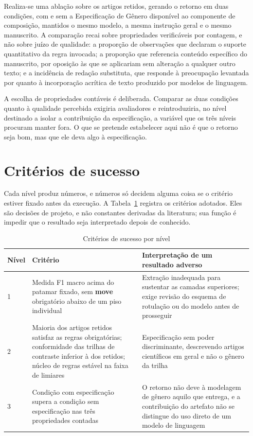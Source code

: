 Realiza-se uma ablação sobre os artigos retidos, gerando o retorno em duas condições, com e sem a Especificação de Gênero disponível ao componente de composição, mantidos o mesmo modelo, a mesma instrução geral e o mesmo manuscrito. A comparação recai sobre propriedades verificáveis por contagem, e não sobre juízo de qualidade: a proporção de observações que declaram o suporte quantitativo da regra invocada; a proporção que referencia conteúdo específico do manuscrito, por oposição às que se aplicariam sem alteração a qualquer outro texto; e a incidência de redação substituta, que responde à preocupação levantada por  quanto à incorporação acrítica de texto produzido por modelos de linguagem.

A escolha de propriedades contáveis é deliberada. Comparar as duas condições quanto à qualidade percebida exigiria avaliadores e reintroduziria, no nível destinado a isolar a contribuição da especificação, a variável que os três níveis procuram manter fora. O que se pretende estabelecer aqui não é que o retorno seja bom, mas que ele deva algo à especificação.


\section{Critérios de sucesso}
\label{sec:criterios}

Cada nível produz números, e números só decidem alguma coisa se o critério estiver fixado antes da execução. A Tabela~\ref{tab:criterios} registra os critérios adotados. Eles são decisões de projeto, e não constantes derivadas da literatura; sua função é impedir que o resultado seja interpretado depois de conhecido.

\begin{table}[H]
\centering
\caption{Critérios de sucesso por nível}
\label{tab:criterios}
\small
\begin{tabular}{|p{1.0cm}|p{5.6cm}|p{6.8cm}|}
\hline
\textbf{Nível} & \textbf{Critério} & \textbf{Interpretação de um resultado adverso} \\
\hline
1 & Medida F1 macro acima do patamar fixado, sem \textbf{move} obrigatório abaixo de um piso individual & Extração inadequada para sustentar as camadas superiores; exige revisão do esquema de rotulação ou do modelo antes de prosseguir \\
\hline
2 & Maioria dos artigos retidos satisfaz as regras obrigatórias; conformidade das trilhas de contraste inferior à dos retidos; núcleo de regras estável na faixa de limiares & Especificação sem poder discriminante, descrevendo artigos científicos em geral e não o gênero da trilha \\
\hline
3 & Condição com especificação supera a condição sem especificação nas três propriedades contadas & O retorno não deve à modelagem de gênero aquilo que entrega, e a contribuição do artefato não se distingue do uso direto de um modelo de linguagem \\
\hline
\end{tabular}
\end{table}

